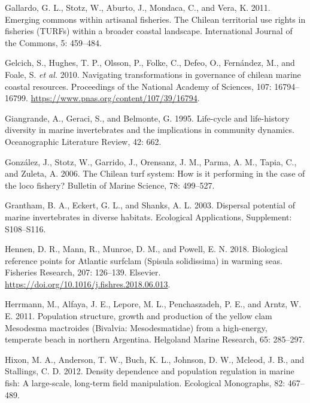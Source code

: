 \documentclass[12pt]{article}
\begin{document}
\leavevmode\hypertarget{ref-Gallardo2011}{}%
Gallardo, G. L., Stotz, W., Aburto, J., Mondaca, C., and Vera, K. 2011.
Emerging commons within artisanal fisheries. The Chilean territorial use
rights in fisheries (TURFs) within a broader coastal landscape.
International Journal of the Commons, 5: 459--484.

\leavevmode\hypertarget{ref-Gelcich2010}{}%
Gelcich, S., Hughes, T. P., Olsson, P., Folke, C., Defeo, O., Fernández,
M., and Foale, S. \emph{et al.} 2010. Navigating transformations in
governance of chilean marine coastal resources. Proceedings of the
National Academy of Sciences, 107: 16794--16799.
\url{https://www.pnas.org/content/107/39/16794}.

\leavevmode\hypertarget{ref-Giangrande1995}{}%
Giangrande, A., Geraci, S., and Belmonte, G. 1995. Life-cycle and
life-history diversity in marine invertebrates and the implications in
community dynamics. Oceanographic Literature Review, 42: 662.

\leavevmode\hypertarget{ref-Gonzalez2006}{}%
González, J., Stotz, W., Garrido, J., Orensanz, J. M., Parma, A. M.,
Tapia, C., and Zuleta, A. 2006. The Chilean turf system: How is it
performing in the case of the loco fishery? Bulletin of Marine Science,
78: 499--527.

\leavevmode\hypertarget{ref-Grantham2003}{}%
Grantham, B. A., Eckert, G. L., and Shanks, A. L. 2003. Dispersal
potential of marine invertebrates in diverse habitats. Ecological
Applications, Supplement: S108--S116.

\leavevmode\hypertarget{ref-Hennen2018}{}%
Hennen, D. R., Mann, R., Munroe, D. M., and Powell, E. N. 2018.
Biological reference points for Atlantic surfclam (Spisula solidissima)
in warming seas. Fisheries Research, 207: 126--139. Elsevier.
\url{https://doi.org/10.1016/j.fishres.2018.06.013}.

\leavevmode\hypertarget{ref-Herrmann2011}{}%
Herrmann, M., Alfaya, J. E., Lepore, M. L., Penchaszadeh, P. E., and
Arntz, W. E. 2011. Population structure, growth and production of the
yellow clam Mesodesma mactroides (Bivalvia: Mesodesmatidae) from a
high-energy, temperate beach in northern Argentina. Helgoland Marine
Research, 65: 285--297.

\leavevmode\hypertarget{ref-Hixon2012}{}%
Hixon, M. A., Anderson, T. W., Buch, K. L., Johnson, D. W., Mcleod, J.
B., and Stallings, C. D. 2012. Density dependence and population
regulation in marine fish: A large-scale, long-term field manipulation.
Ecological Monographs, 82: 467--489.
\end{document}
